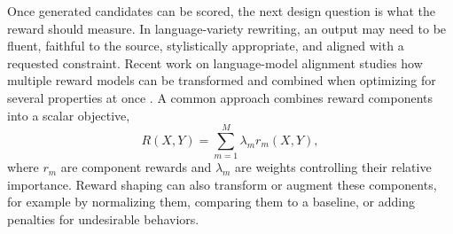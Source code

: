 Once generated candidates can be scored, the next design question is what the
reward should measure. In
language-variety rewriting, an output may need to be fluent, faithful to the
source, stylistically appropriate, and aligned with a requested constraint.
Recent work on language-model alignment studies how multiple reward
models can be transformed and combined when optimizing for several properties
at once \citep{pmlr-v235-wang24ay}. A common approach combines reward
components into a scalar objective,
\begin{equation}
R(X,Y) = \sum_{m=1}^{M} \lambda_m r_m(X,Y),
\end{equation}
where \(r_m\) are component rewards and \(\lambda_m\) are weights controlling
their relative importance. Reward shaping can also transform or augment these
components, for example by normalizing them, comparing them to a baseline, or
adding penalties for undesirable behaviors.
